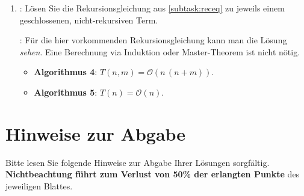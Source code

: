 \documentclass[german, solution]{acAssignment}
\begin{document}
\begin{enumerate}
    \item
        :
        Lösen Sie die Rekursionsgleichung aus \cref{subtask:receq} zu jeweils einem geschlossenen, nicht-rekursiven Term.
        
        \acNote:
        Für die hier vorkommenden Rekursionsgleichung kann man die Lösung \emph{sehen}.
        Eine Berechnung via Induktion oder Master-Theorem ist nicht nötig.
        
        \begin{acSolution}
            \begin{itemize}
                \item \textbf{Algorithmus 4}: $T(n, m) = \mathcal{O}(n\,(n + m))$.
                \item \textbf{Algorithmus 5}: $T(n) = \mathcal{O}(n)$.
            \end{itemize}
        \end{acSolution}
\end{enumerate}


\section{Hinweise zur Abgabe}
\label{sec:submission-notes}

Bitte lesen Sie folgende Hinweise zur Abgabe Ihrer Lösungen sorgfältig.
\textbf{Nichtbeachtung führt zum Verlust von 50\% der erlangten Punkte} des jeweiligen Blattes.
\end{document}
